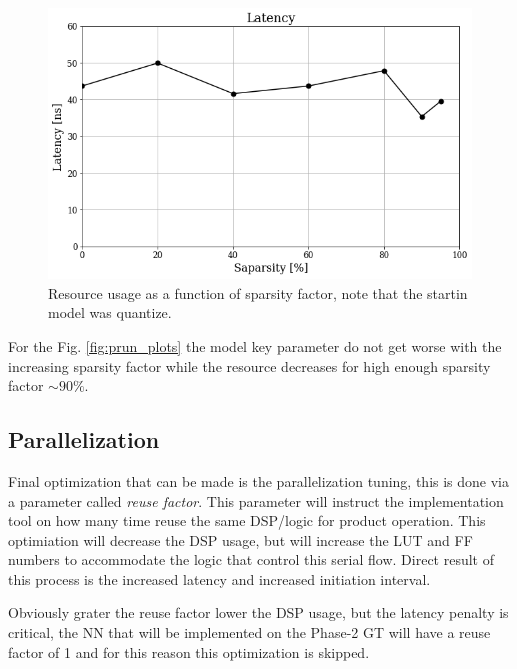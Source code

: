 \documentclass[../../main.tex]{subfiles}
\begin{document}
\begin{figure}[ht]
\begin{minipage}[b]{0.5\linewidth}
    \vspace{2ex}
  \end{minipage}%
  \begin{minipage}[b]{0.5\linewidth}
    \centering
    \includegraphics[width=.95\linewidth]{sections/05/Images/Prune_Lat_1ele.png}
    \vspace{2ex}
  \end{minipage}
  \caption{Resource usage as a function of sparsity factor, note that the startin model was quantize.} 
  \label{fig:prune_resource}
\end{figure}

For the Fig. \ref{fig:prun_plots} the model key parameter do not get worse with the increasing sparsity factor while the resource decreases for high enough sparsity factor $\sim90\%$.

\subsection{Parallelization}
\label{sec:P2GT_Par}
Final optimization that can be made is the parallelization tuning, this is done via a parameter called \textit{reuse factor}. This parameter will instruct the implementation tool on how many time reuse the same DSP/logic for product operation. This optimiation will decrease the DSP usage, but will increase the LUT and FF numbers to accommodate the logic that control this serial flow. Direct result of this process is the increased latency and increased initiation interval.  

Obviously grater the reuse factor lower the DSP usage, but the latency penalty is critical, the NN that will be implemented on the Phase-2 GT will have a reuse factor of 1 and for this reason this optimization is skipped. 
\end{document}
